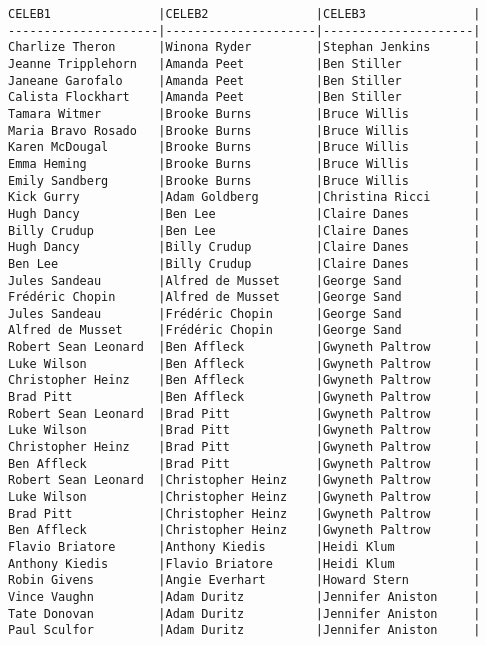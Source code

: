 \documentclass{article}
\begin{document}
        \begin{verbatim}
CELEB1               |CELEB2               |CELEB3               |
---------------------|---------------------|---------------------|
Charlize Theron      |Winona Ryder         |Stephan Jenkins      |
Jeanne Tripplehorn   |Amanda Peet          |Ben Stiller          |
Janeane Garofalo     |Amanda Peet          |Ben Stiller          |
Calista Flockhart    |Amanda Peet          |Ben Stiller          |
Tamara Witmer        |Brooke Burns         |Bruce Willis         |
Maria Bravo Rosado   |Brooke Burns         |Bruce Willis         |
Karen McDougal       |Brooke Burns         |Bruce Willis         |
Emma Heming          |Brooke Burns         |Bruce Willis         |
Emily Sandberg       |Brooke Burns         |Bruce Willis         |
Kick Gurry           |Adam Goldberg        |Christina Ricci      |
Hugh Dancy           |Ben Lee              |Claire Danes         |
Billy Crudup         |Ben Lee              |Claire Danes         |
Hugh Dancy           |Billy Crudup         |Claire Danes         |
Ben Lee              |Billy Crudup         |Claire Danes         |
Jules Sandeau        |Alfred de Musset     |George Sand          |
Frédéric Chopin      |Alfred de Musset     |George Sand          |
Jules Sandeau        |Frédéric Chopin      |George Sand          |
Alfred de Musset     |Frédéric Chopin      |George Sand          |
Robert Sean Leonard  |Ben Affleck          |Gwyneth Paltrow      |
Luke Wilson          |Ben Affleck          |Gwyneth Paltrow      |
Christopher Heinz    |Ben Affleck          |Gwyneth Paltrow      |
Brad Pitt            |Ben Affleck          |Gwyneth Paltrow      |
Robert Sean Leonard  |Brad Pitt            |Gwyneth Paltrow      |
Luke Wilson          |Brad Pitt            |Gwyneth Paltrow      |
Christopher Heinz    |Brad Pitt            |Gwyneth Paltrow      |
Ben Affleck          |Brad Pitt            |Gwyneth Paltrow      |
Robert Sean Leonard  |Christopher Heinz    |Gwyneth Paltrow      |
Luke Wilson          |Christopher Heinz    |Gwyneth Paltrow      |
Brad Pitt            |Christopher Heinz    |Gwyneth Paltrow      |
Ben Affleck          |Christopher Heinz    |Gwyneth Paltrow      |
Flavio Briatore      |Anthony Kiedis       |Heidi Klum           |
Anthony Kiedis       |Flavio Briatore      |Heidi Klum           |
Robin Givens         |Angie Everhart       |Howard Stern         |
Vince Vaughn         |Adam Duritz          |Jennifer Aniston     |
Tate Donovan         |Adam Duritz          |Jennifer Aniston     |
Paul Sculfor         |Adam Duritz          |Jennifer Aniston     |

\end{verbatim}
\end{document}
